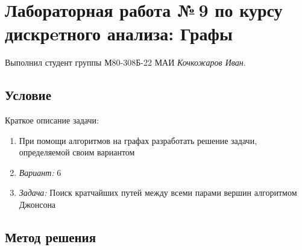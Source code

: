 \documentclass[12pt]{article}
\begin{document}
\section*{Лабораторная работа №\,9 по курсу дискрeтного анализа: Графы}

Выполнил студент группы М80-308Б-22 МАИ \textit{Кочкожаров Иван}.

\subsection*{Условие}

Краткое описание задачи:
\begin{enumerate}
    \item При помощи алгоритмов на графах разработать решение задачи, определяемой
    своим вариантом
    \item \textit{Вариант:} 6
    \item \textit{Задача:} Поиск кратчайших путей между всеми парами вершин алгоритмом Джонсона
\end{enumerate}

\subsection*{Метод решения}
\end{document}

